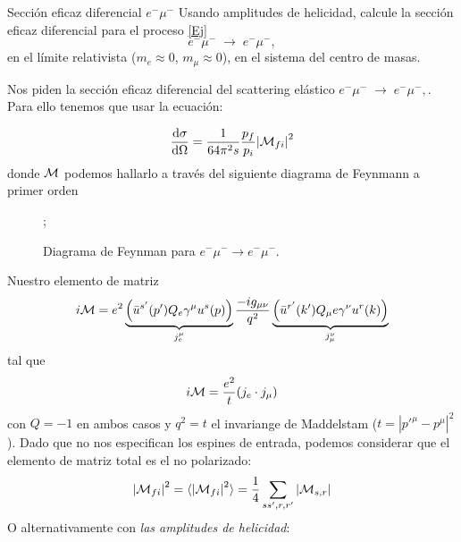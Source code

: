 

\begin{Ejercicio}{Sección eficaz diferencial $e^-\mu^-$}\label{Ej:6}
	Usando amplitudes de helicidad, calcule la sección eficaz diferencial para el proceso \ref{Ej}
	\[
		e^- \mu^- \;\to\; e^- \mu^-,
	\]
	en el límite relativista ($m_e \approx 0$, $m_\mu \approx 0$), en el sistema del centro de masas.
\end{Ejercicio}

Nos piden la sección eficaz diferencial del scattering elástico $e^- \mu^- \;\to\; e^- \mu^-,$. Para ello tenemos que usar la ecuación:

\begin{equation}
	\dv{\sigma}{\Omega} = \frac{1}{64 \pi^2 s} \frac{p_f}{p_i} \vqty{\Mcal_{fi}}^2
\end{equation}
donde $\mathcal{M}$ podemos hallarlo a través del siguiente diagrama de Feynmann a primer orden
\begin{figure}[h]
	\centering
	;
	\caption{Diagrama de Feynman para \(e^- \mu^- \to e^- \mu^-\).}
\end{figure}
Nuestro elemento de matriz
\begin{equation}
	i \Mcal =e^2 \underbrace{\pqty{\bar{u}^{s'}(p') Q_e  \gamma^\mu u^{s}(p)}}_{j_e^\mu}  \frac{-ig_{\mu \nu}}{q^2}  \underbrace{\pqty{\bar{u}^{r'}(k') Q_\mu e \gamma^\nu u^{r}(k)}}_{{j_\mu^\nu} }
\end{equation}
tal que
\begin{equation}
	i \mathcal{M} =\frac{e^2}{t} (j_e \cdot j_\mu)
\end{equation}
con $Q=-1$ en ambos casos y $q^2=t$ el invariange de Maddelstam ($t=|p'^\mu-p^\mu|^2$). Dado que no nos especifican los espines de entrada, podemos considerar que el elemento de matriz total es el no polarizado:
\begin{equation}
	\vqty{\Mcal_{fi}}^2 = \langle \vqty{\Mcal_{fi}}^2 \rangle = \frac{1}{4} \sum_{ss',r,r'} \vqty{\Mcal_{s,r}}
\end{equation}
O alternativamente con \textit{las amplitudes de helicidad}:
